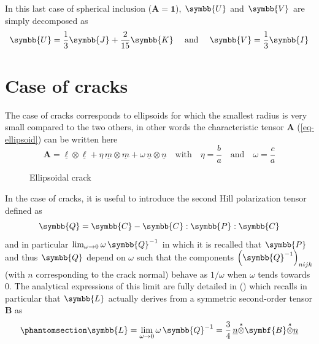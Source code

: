 \documentclass[
  a4paper,
  numbers=noendperiod,
  DIV=12]{scrreprt}
\newcommand{\uu}[1]{{\symbf{{#1}}}}
\newcommand{\uuuu}[1]{{\symbb{{#1}}}}
\newcommand{\uv}[1]{{\underline{{#1}}}}
\newcommand{\sotimes}{{\stackrel{s}{\otimes}}}
\begin{document}
In this last case of spherical inclusion (\(\uu{A}=\uu{1}\)),
\(\uuuu{U}\) and \(\uuuu{V}\) are simply decomposed as \[
\uuuu{U}=\frac{1}{3}\uuuu{J}+\frac{2}{15}\uuuu{K}
\quad\textrm{ and }\quad
\uuuu{V}=\frac{1}{3}\uuuu{I}
\]

\section{Case of cracks}\label{case-of-cracks}

The case of cracks corresponds to ellipsoids for which the smallest
radius is very small compared to the two others, in other words the
characteristic tensor \(\uu{A}\) (\ref{eq-ellipsoid}) can be written
here \[
\uu{A}=
\uv{\ell}\otimes\uv{\ell}+
\eta\,\uv{m}\otimes\uv{m}+
\omega\,\uv{n}\otimes\uv{n}
\quad\textrm{with}\quad
\eta=\frac{b}{a}
\quad\textrm{and}\quad
\omega=\frac{c}{a}
\]

\begin{figure}


\caption{\label{fig-crack}Ellipsoidal crack}

\end{figure}%

In the case of cracks, it is useful to introduce the second Hill
polarization tensor defined as \[
\uuuu{Q}=\uuuu{C}-\uuuu{C}:\uuuu{P}:\uuuu{C}
\] and in particular \(\lim_{\omega\to 0}\omega\,\uuuu{Q}^{-1}\) in
which it is recalled that \(\uuuu{P}\) and thus \(\uuuu{Q}\) depend on
\(\omega\) such that the components
\(\left(\uuuu{Q}^{-1}\right)_{nijk}\) (with \(n\) corresponding to the
crack normal) behave as \(1/\omega\) when \(\omega\) tends towards
\(0\). The analytical expressions of this limit are fully detailed in
() which
recalls in particular that \(\uuuu{L}\) actually derives from a
symmetric second-order tensor \(\uu{B}\) as
\begin{equation}\phantomsection\label{eq-L}{
\uuuu{L}=
\lim_{\omega\to 0} \omega\,\uuuu{Q}^{-1}
=\frac{3}{4}\,\uv{n}\sotimes\uu{B}\sotimes\uv{n}
}\end{equation}
\end{document}
